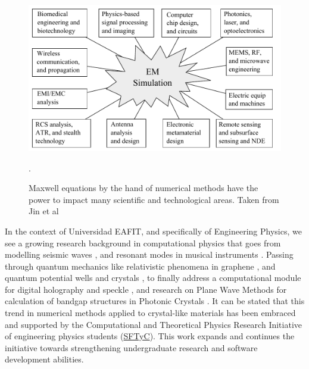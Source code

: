\begin{figure}[h]
\centering
\includegraphics[scale=0.5]{./img/EM_simulation_applications.pdf}
\caption{Maxwell equations by the hand of numerical methods have the power to impact many scientific and technological areas. Taken from Jin et al \cite{Jin2010}}.
\label{fig:simulation_areas}
\end{figure}

In the context of Universidad EAFIT, and specifically of Engineering Physics, we see a growing research background in computational physics that goes from modelling seismic waves \cite{Guarin2012}, and resonant modes in musical instruments \cite{Rodriguez2012}. Passing through quantum mechanics like relativistic phenomena in graphene \cite{Villegas2011}, and quantum potential wells and crystals \cite{Echeverri2011}, to finally address a computational module for digital holography and speckle \cite{Sierra2010}, and research on Plane Wave Methods for calculation of bandgap structures in Photonic Crystals \cite{Loaiza2011}. It can be stated that this trend in numerical methods applied to crystal-like materials has been embraced and supported by the Computational and Theoretical Physics Research Initiative of engineering physics students (\href{https://sites.google.com/site/fisicatyc/home}{SFTyC}). This work expands and continues the initiative towards strengthening undergraduate research and software development abilities. 

\pagebreak